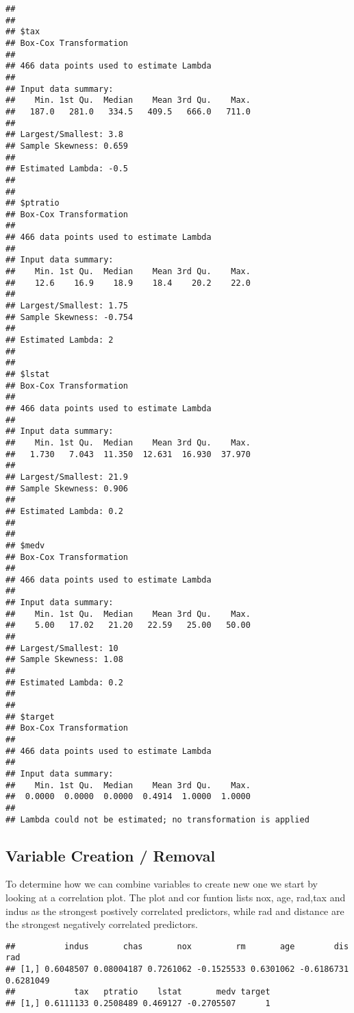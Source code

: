 \documentclass[
]{article}
\begin{document}
\begin{verbatim}
## 
## 
## $tax
## Box-Cox Transformation
## 
## 466 data points used to estimate Lambda
## 
## Input data summary:
##    Min. 1st Qu.  Median    Mean 3rd Qu.    Max. 
##   187.0   281.0   334.5   409.5   666.0   711.0 
## 
## Largest/Smallest: 3.8 
## Sample Skewness: 0.659 
## 
## Estimated Lambda: -0.5 
## 
## 
## $ptratio
## Box-Cox Transformation
## 
## 466 data points used to estimate Lambda
## 
## Input data summary:
##    Min. 1st Qu.  Median    Mean 3rd Qu.    Max. 
##    12.6    16.9    18.9    18.4    20.2    22.0 
## 
## Largest/Smallest: 1.75 
## Sample Skewness: -0.754 
## 
## Estimated Lambda: 2 
## 
## 
## $lstat
## Box-Cox Transformation
## 
## 466 data points used to estimate Lambda
## 
## Input data summary:
##    Min. 1st Qu.  Median    Mean 3rd Qu.    Max. 
##   1.730   7.043  11.350  12.631  16.930  37.970 
## 
## Largest/Smallest: 21.9 
## Sample Skewness: 0.906 
## 
## Estimated Lambda: 0.2 
## 
## 
## $medv
## Box-Cox Transformation
## 
## 466 data points used to estimate Lambda
## 
## Input data summary:
##    Min. 1st Qu.  Median    Mean 3rd Qu.    Max. 
##    5.00   17.02   21.20   22.59   25.00   50.00 
## 
## Largest/Smallest: 10 
## Sample Skewness: 1.08 
## 
## Estimated Lambda: 0.2 
## 
## 
## $target
## Box-Cox Transformation
## 
## 466 data points used to estimate Lambda
## 
## Input data summary:
##    Min. 1st Qu.  Median    Mean 3rd Qu.    Max. 
##  0.0000  0.0000  0.0000  0.4914  1.0000  1.0000 
## 
## Lambda could not be estimated; no transformation is applied
\end{verbatim}

\hypertarget{variable-creation-removal}{%
\subsection{Variable Creation /
Removal}\label{variable-creation-removal}}

To determine how we can combine variables to create new one we start by
looking at a correlation plot. The plot and cor funtion lists nox, age,
rad,tax and indus as the strongest postively correlated predictors,
while rad and distance are the strongest negatively correlated
predictors.

\begin{verbatim}
##          indus       chas       nox         rm       age        dis       rad
## [1,] 0.6048507 0.08004187 0.7261062 -0.1525533 0.6301062 -0.6186731 0.6281049
##            tax   ptratio    lstat       medv target
## [1,] 0.6111133 0.2508489 0.469127 -0.2705507      1
\end{verbatim}
\end{document}
